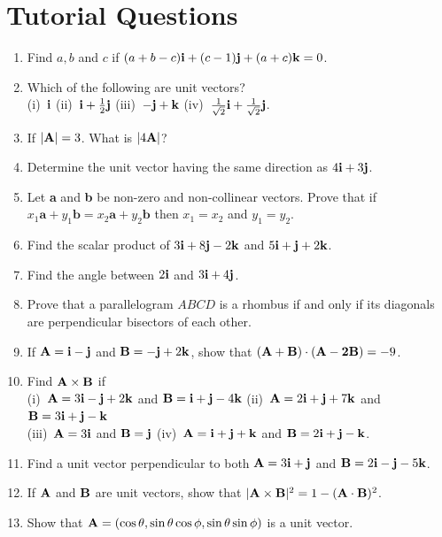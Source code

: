 \documentclass[titlepage,a4paper,12pt]{report}
\begin{document}
\section{Tutorial Questions}
\begin{enumerate}
\item Find $a,b$ and $c$ if $(a+b-c){\bf{i}}+(c-1){\bf{j}}+(a+c){\bf{k}}=0$.
\item Which of the following are unit vectors? \\
(i)\, ${\bf{i}}$ \quad (ii)\, ${\bf{i}}+\frac{1}{2}{\bf{j}}$ \quad (iii)\, $-{\bf{j}}+{\bf{k}}$ \quad (iv)\, $\frac{1}{\sqrt{2}}{\bf{i}}+\frac{1}{\sqrt{2}}{\bf{j}}$.
\item If $|{\bf{A}}|=3$. What is $|4{\bf{A}}|$?
\item Determine the unit vector having the same direction as $4{\bf{i}}+3{\bf{j}}$.
\item Let \textbf{a} and \textbf{b} be non-zero and non-collinear vectors. Prove that if $x_1 \textbf{a}+y_1\textbf{b}=x_2 \textbf{a}+y_2\textbf{b}$ then $x_1=x_2$ and $y_1=y_2$.
\item Find the scalar product of $3{\bf{i}}+8{\bf{j}}-2{\bf{k}}$ and $5{\bf{i}}+{\bf{j}}+2{\bf{k}}$.
\item Find the angle between $2{\bf{i}}$ and $3{\bf{i}}+4{\bf{j}}$.
\item Prove that a parallelogram $ABCD$ is a rhombus if and only if its diagonals are perpendicular bisectors of each other.
\item If ${\bf{A}}={\bf{i}}-{\bf{j}}$ and ${\bf{B}}=-{\bf{j}}+2{\bf{k}}$, show that $({\bf{A}+\bf{B}})\cdot ({\bf{A}-2\bf{B}})=-9$.
\item Find ${\bf{A}\times \bf{B}}$ if \\
(i)\, ${\bf{A}}=3{\bf{i}}-{\bf{j}}+2{\bf{k}}$ and ${\bf{B}}={\bf{i}}+{\bf{j}}-4{\bf{k}}$ \quad (ii)\, ${\bf{A}}=2{\bf{i}}+{\bf{j}}+7{\bf{k}}$ and ${\bf{B}}=3{\bf{i}}+{\bf{j}}-{\bf{k}}$\\
(iii)\, ${\bf{A}}=3{\bf{i}}$ and ${\bf{B}}={\bf{j}}$ \quad (iv)\, ${\bf{A}}={\bf{i}}+{\bf{j}}+{\bf{k}}$ and ${\bf{B}}=2{\bf{i}}+{\bf{j}}-{\bf{k}}$.
\item Find a unit vector perpendicular to both ${\bf{A}}=3{\bf{i}}+{\bf{j}}$ and ${\bf{B}}=2{\bf{i}}-{\bf{j}}-5{\bf{k}}$.
\item If ${\bf{A}}$ and ${\bf{B}}$ are unit vectors, show that $|{\bf{A}\times \bf{B}}|^2 =1-({\bf{A}\cdot \bf{B}})^2$.
\item Show that ${\bf{A}}=(\cos \theta , \sin \theta \cos \phi , \sin \theta \sin \phi)$ is a unit vector.

\end{enumerate}
\end{document}
